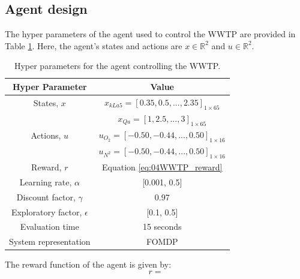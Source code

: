 \subsection{Agent design}

The hyper parameters of the agent used to control the WWTP are provided in Table \ref{tab:04WWTPagent}. Here, the agent's states and actions are $x \in \mathbb{R}^2$ and $u \in \mathbb{R}^2$.  

\begin{table}[H]
\caption{Hyper parameters for the agent controlling the WWTP.}
\label{tab:04WWTPagent}
\centering
\begin{tabular}{c|c}
\textbf{Hyper Parameter}     & \textbf{Value}  \\
\hline
States, $x$	             	& $x_{kLa5} = [0.35, 0.5, ..., 2.35]_{1 \times 65} $		 \\
        	             	& $x_{Qa} = [1, 2.5, ..., 3]_{1 \times 65} $		 \\
Actions, $u$                & $u_{O_2} = [-0.50, -0.44, ..., 0.50]_{1 \times 16}$	         \\
                            & $u_{N^2} = [-0.50, -0.44, ..., 0.50]_{1 \times 16}$		\\
Reward, $r$	                & Equation \ref{eq:04WWTP_reward}		\\
Learning rate, $\alpha$		& [0.001, 0.5]		 \\
Discount factor, $\gamma$      	& 0.97  \\
Exploratory factor, $\epsilon$             & [0.1, 0.5]  \\
Evaluation time                 & 15 seconds \\
System representation           & FOMDP \\
\end{tabular}
\end{table}

The reward function of the agent is given by:
\begin{equation}
    r = 
    \label{eq:04WWTP_reward}
\end{equation}



